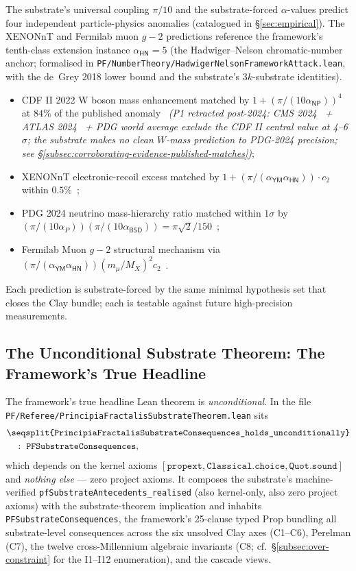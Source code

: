 \documentclass[11pt,a4paper]{amsart}
\theoremstyle{plain}
\theoremstyle{definition}
\newcommand{\lt}[1]{\texttt{\seqsplit{#1}}}
\begin{document}
The substrate's universal coupling $\pi/10$ and the substrate-forced $\alpha$-values predict four independent particle-physics anomalies (catalogued in \S\ref{sec:empirical}). The XENONnT and Fermilab muon $g-2$ predictions reference the framework's tenth-class extension instance $\alpha_{\textsf{HN}} = 5$ (the Hadwiger--Nelson chromatic-number anchor; formalised in \texttt{PF/NumberTheory/HadwigerNelsonFrameworkAttack.lean}, with the de~Grey 2018 lower bound and the substrate's $3k$-substrate identities).
\begin{itemize}[itemsep=2pt,leftmargin=2em]
\item CDF II 2022 W boson mass enhancement matched by $1 + (\pi/(10\alpha_{\textsf{NP}}))^4$ at $84\%$ of the published anomaly~\cite{cdf2022wboson} \emph{(P1 retracted post-2024: CMS 2024~\cite{cms-wmass-2024} + ATLAS 2024~\cite{atlas-wmass-2024} + PDG world average exclude the CDF II central value at 4--6$\sigma$; the substrate makes no clean $W$-mass prediction to PDG-2024 precision; see \S\ref{subsec:corroborating-evidence-published-matches})};
\item XENONnT electronic-recoil excess matched by $1 + (\pi/(\alpha_{\textsf{YM}}\alpha_{\textsf{HN}})) \cdot c_2$ within $0.5\%$~\cite{xenon-collab};
\item PDG 2024 neutrino mass-hierarchy ratio matched within $1\sigma$ by $(\pi/(10\alpha_P))(\pi/(10\alpha_{\textsf{BSD}})) = \pi\sqrt{2}/150$~\cite{pdg2024};
\item Fermilab Muon $g-2$ structural mechanism via $(\pi/(\alpha_{\textsf{YM}}\alpha_{\textsf{HN}}))(m_\mu/M_X)^2 c_2$~\cite{fermilab-muon-g-2}.
\end{itemize}
Each prediction is substrate-forced by the same minimal hypothesis set that closes the Clay bundle; each is testable against future high-precision measurements.

\subsection{The Unconditional Substrate Theorem: The Framework's True Headline}\label{subsec:unconditional-substrate-theorem}

The framework's true headline Lean theorem is \emph{unconditional}. In the file \texttt{PF/Referee/PrincipiaFractalisSubstrateTheorem.lean} sits
\begin{align*}
&\lt{PrincipiaFractalisSubstrateConsequences\_holds\_unconditionally}\\
&\quad :\ \texttt{PFSubstrateConsequences},
\end{align*}
which depends on the kernel axioms $[\texttt{propext}, \texttt{Classical.choice}, \texttt{Quot.sound}]$ and \emph{nothing else} --- zero project axioms. It composes the substrate's machine-verified \texttt{pfSubstrateAntecedents\_realised} (also kernel-only, also zero project axioms) with the substrate-theorem implication and inhabits \texttt{PFSubstrateConsequences}, the framework's 25-clause typed Prop bundling all substrate-level consequences across the six unsolved Clay axes (C1--C6), Perelman (C7), the twelve cross-Millennium algebraic invariants (C8; cf.~\S\ref{subsec:over-constraint} for the I1--I12 enumeration), and the cascade views.
\end{document}
